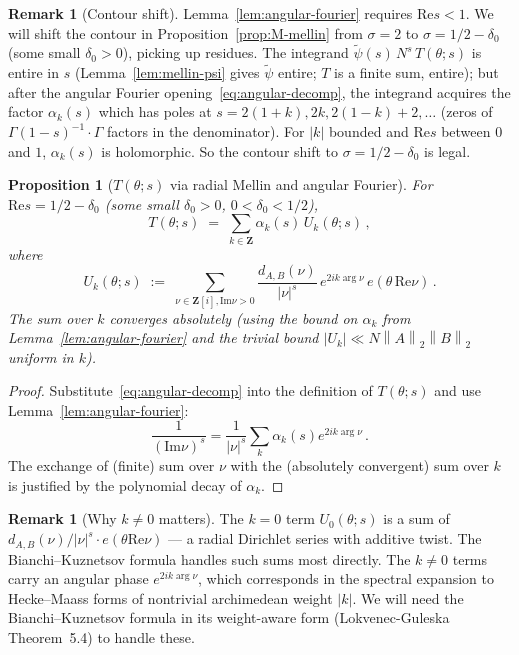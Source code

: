 \documentclass[11pt]{article}
\newtheorem{proposition}[theorem]{Proposition}
\theoremstyle{definition}
\newtheorem{remark}[theorem]{Remark}
\newcommand{\Z}{\mathbf{Z}}
\newcommand{\Zi}{\Z[i]}
\renewcommand{\Re}{\mathrm{Re}}
\renewcommand{\Im}{\mathrm{Im}}
\newcommand{\norm}[1]{\left\lVert #1\right\rVert}
\begin{document}
\begin{remark}[Contour shift]\label{rem:contour-shift-1-2}
Lemma~\ref{lem:angular-fourier} requires $\Re s<1$. We will shift the contour in Proposition~\ref{prop:M-mellin} from $\sigma=2$ to $\sigma=1/2-\delta_0$ (some small $\delta_0>0$), picking up residues. The integrand $\widetilde\psi(s)\,N^s\,T(\theta;s)$ is entire in $s$ (Lemma~\ref{lem:mellin-psi} gives $\widetilde\psi$ entire; $T$ is a finite sum, entire); but after the angular Fourier opening~\eqref{eq:angular-decomp}, the integrand acquires the factor $\alpha_k(s)$ which has poles at $s=2(1+k),2k,2(1-k)+2,\ldots$ (zeros of $\Gamma(1-s)^{-1}\cdot\Gamma$ factors in the denominator). For $|k|$ bounded and $\Re s$ between $0$ and $1$, $\alpha_k(s)$ is holomorphic. So the contour shift to $\sigma=1/2-\delta_0$ is legal.
\end{remark}

\begin{proposition}[$T(\theta;s)$ via radial Mellin and angular Fourier]\label{prop:T-radial}
For $\Re s=1/2-\delta_0$ (some small $\delta_0>0$, $0<\delta_0<1/2$),
\[
   T(\theta;s)\;=\;\sum_{k\in\Z}\alpha_k(s)\,U_k(\theta;s)\,,
\]
where
\[
   U_k(\theta;s)\;:=\;\sum_{\nu\in\Zi,\Im\nu>0}\frac{d_{A,B}(\nu)}{|\nu|^s}\,e^{2ik\arg\nu}\,e(\theta\,\Re\nu)\,.
\]
The sum over $k$ converges absolutely (using the bound on $\alpha_k$ from Lemma~\ref{lem:angular-fourier} and the trivial bound $|U_k|\ll N\norm{A}_2\norm{B}_2$ uniform in $k$).
\end{proposition}

\begin{proof}
Substitute~\eqref{eq:angular-decomp} into the definition of $T(\theta;s)$ and use Lemma~\ref{lem:angular-fourier}:
\[
   \frac{1}{(\Im\nu)^s}=\frac{1}{|\nu|^s}\sum_k\alpha_k(s)e^{2ik\arg\nu}\,.
\]
The exchange of (finite) sum over $\nu$ with the (absolutely convergent) sum over $k$ is justified by the polynomial decay of $\alpha_k$.
\end{proof}

\begin{remark}[Why $k\ne 0$ matters]\label{rem:k-nonzero}
The $k=0$ term $U_0(\theta;s)$ is a sum of $d_{A,B}(\nu)/|\nu|^s\cdot e(\theta\Re\nu)$ — a radial Dirichlet series with additive twist. The Bianchi--Kuznetsov formula handles such sums most directly. The $k\ne 0$ terms carry an angular phase $e^{2ik\arg\nu}$, which corresponds in the spectral expansion to Hecke--Maass forms of nontrivial archimedean weight $|k|$. We will need the Bianchi--Kuznetsov formula in its weight-aware form (Lokvenec-Guleska Theorem~5.4) to handle these.
\end{remark}
\end{document}
